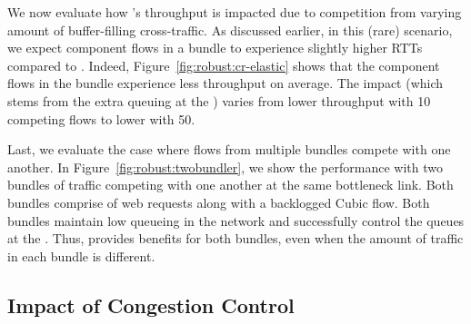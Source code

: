 
We now evaluate how \name's throughput is impacted due to competition from varying amount of buffer-filling cross-traffic. 
As discussed earlier, in this (rare) scenario, we expect component flows in a bundle to experience slightly higher RTTs compared to \baseline.
Indeed, Figure~\ref{fig:robust:cr-elastic} shows that 
the component flows in the bundle experience  \bundlerElasticTputWorseness less throughput on average. The impact (which stems from the extra queuing at the \inbox) varies from \bundlerElasticTputWorsenessTen lower throughput with 10 competing flows to \bundlerElasticTputWorsenessFifty lower with 50. 


 Last, we evaluate the case where flows from multiple bundles compete with one another. 
In Figure~\ref{fig:robust:twobundler}, we show the performance with two bundles of traffic competing with one another at the same bottleneck link. 
Both bundles comprise of web requests along with a backlogged Cubic flow. 
Both bundles maintain low queueing in the network and successfully control the queues at the \inbox.
Thus, \name provides benefits for both bundles, even when the amount of traffic in each bundle is different.  

\subsection{Impact of Congestion Control}\label{s:eval:cc}

